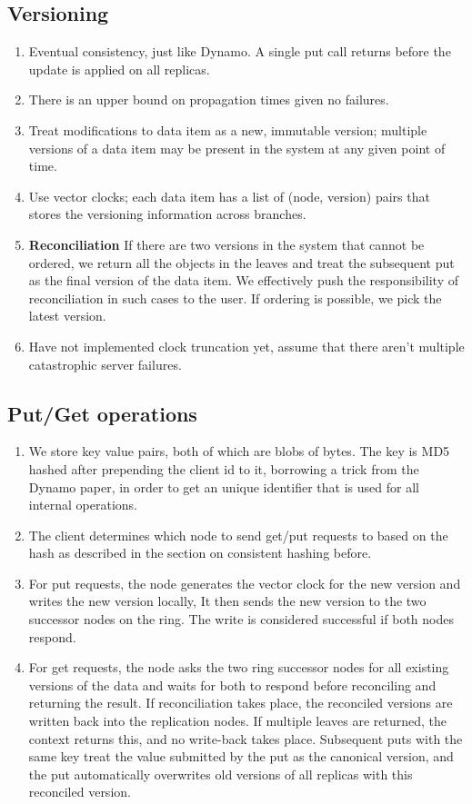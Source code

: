 \documentclass[paper=a4,fontsize=11pt]{report} %
\numberwithin{equation}{section} %
\numberwithin{figure}{section} %
\numberwithin{table}{section} %
\begin{document}
\subsection{Versioning}
\begin{enumerate}
\item Eventual consistency, just like Dynamo. A single put call returns before the update is applied on all replicas.
\item There is an upper bound on propagation times given no failures.
\item Treat modifications to data item as a new, immutable version; multiple versions of a data item may be present in the system at any given point of time.
\item Use vector clocks; each data item has a list of (node, version) pairs that stores the versioning information across branches.
\item \textbf{Reconciliation} If there are two versions in the system that cannot be ordered, we return all the objects in the leaves and treat the subsequent put as the final version of the data item. We effectively push the responsibility of reconciliation in such cases to the user. If ordering is possible, we pick the latest version.
\item Have not implemented clock truncation yet, assume that there aren't multiple catastrophic server failures.
\end{enumerate}

\subsection{Put/Get operations}
\begin{enumerate}
\item We store key value pairs, both of which are blobs of bytes. The key is MD5 hashed after prepending the client id to it, borrowing a trick from the Dynamo paper, in order to get an unique identifier that is used for all internal operations.
\item The client determines which node to send get/put requests to based on the hash as described in the section on consistent hashing before.
\item For put requests, the node generates the vector clock for the new version and writes the new version locally, It then sends the new version to the two successor nodes on the ring. The write is considered successful if both nodes respond.
\item For get requests, the node asks the two ring successor nodes for all existing versions of the data and waits for both to respond before reconciling and returning the result. If reconciliation takes place, the reconciled versions are written back into the replication nodes. If multiple leaves are returned, the context returns this, and no write-back takes place. Subsequent puts with the same key treat the value submitted by the put as the canonical version, and the put automatically overwrites old versions of all replicas with this reconciled version.
\end{enumerate}
\end{document}
